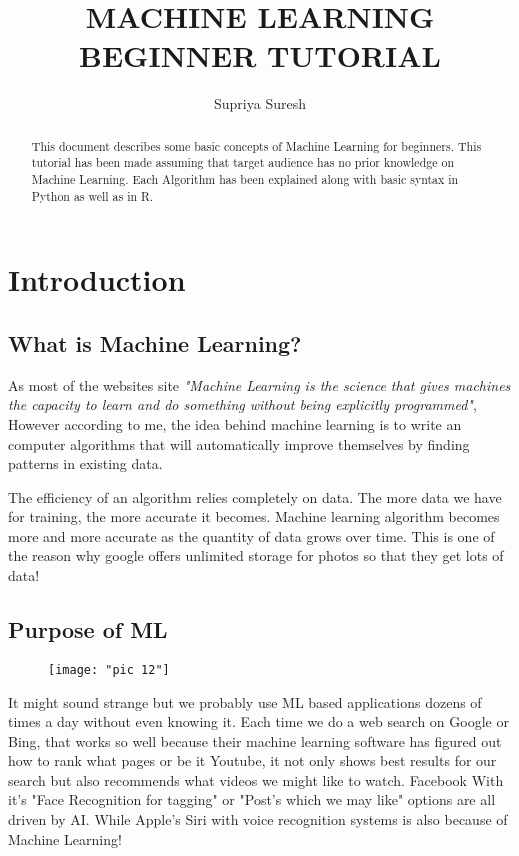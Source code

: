 \documentclass[Proceedings]{ascelike}
\title{MACHINE LEARNING BEGINNER TUTORIAL}
\author{Supriya Suresh}
\begin{document}
\maketitle

\tableofcontents

\newpage
\begin{abstract}
This document describes some basic concepts of Machine Learning for beginners. This tutorial has been made assuming that target audience has no prior knowledge on Machine Learning. Each Algorithm has been explained along with basic syntax in Python as well as in R. 
\end{abstract}


\section{Introduction}

\subsection{What is Machine Learning?}
As most of the websites site \textit{"Machine Learning is the science that gives machines the capacity to learn and do something without being explicitly programmed"}, However according to me, the idea behind machine learning is to write an computer algorithms that will automatically improve themselves by finding patterns in existing data.

The efficiency of an algorithm relies completely on data. The more data we have for training, the more accurate it becomes. Machine learning algorithm becomes more and more accurate as the quantity of data grows over time. This is one of the reason why google offers unlimited storage for photos so that they get lots of data!

\subsection{Purpose of ML}
\begin{figure}[!ht]
	\texttt{[image: "pic 12"]}
	\caption{}
	\label{fig:pic-12}
\end{figure}

It might sound strange but we probably use ML based applications dozens of times a day without even knowing it. Each time we do a web search on Google or Bing, that works so well because their machine learning software has figured out how to rank what pages or be it Youtube, it not only shows best results for our search but also recommends what videos we might like to watch. Facebook With it's "Face Recognition for tagging" or "Post's which we may like" options are all driven by AI. While Apple's Siri with voice recognition systems is also because of Machine Learning!\\
\end{document}
